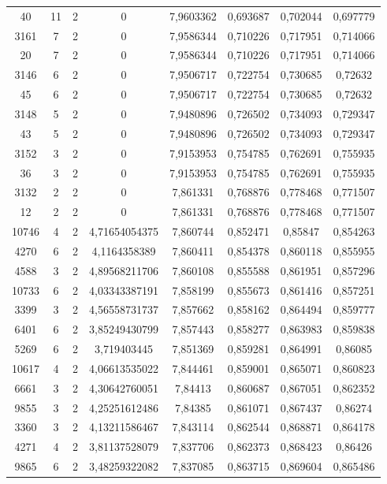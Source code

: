 \begin{longtable}{|c|c|c|c|c|c|c|c|}
40 & 11 & 2 & 0 & 7,9603362 & 0,693687 & 0,702044 & 0,697779 \\
3161 & 7 & 2 & 0 & 7,9586344 & 0,710226 & 0,717951 & 0,714066 \\
20 & 7 & 2 & 0 & 7,9586344 & 0,710226 & 0,717951 & 0,714066 \\
3146 & 6 & 2 & 0 & 7,9506717 & 0,722754 & 0,730685 & 0,72632 \\
45 & 6 & 2 & 0 & 7,9506717 & 0,722754 & 0,730685 & 0,72632 \\
3148 & 5 & 2 & 0 & 7,9480896 & 0,726502 & 0,734093 & 0,729347 \\
43 & 5 & 2 & 0 & 7,9480896 & 0,726502 & 0,734093 & 0,729347 \\
3152 & 3 & 2 & 0 & 7,9153953 & 0,754785 & 0,762691 & 0,755935 \\
36 & 3 & 2 & 0 & 7,9153953 & 0,754785 & 0,762691 & 0,755935 \\
3132 & 2 & 2 & 0 & 7,861331 & 0,768876 & 0,778468 & 0,771507 \\
12 & 2 & 2 & 0 & 7,861331 & 0,768876 & 0,778468 & 0,771507 \\
10746 & 4 & 2 & 4,71654054375 & 7,860744 & 0,852471 & 0,85847 & 0,854263 \\
4270 & 6 & 2 & 4,1164358389 & 7,860411 & 0,854378 & 0,860118 & 0,855955 \\
4588 & 3 & 2 & 4,89568211706 & 7,860108 & 0,855588 & 0,861951 & 0,857296 \\
10733 & 6 & 2 & 4,03343387191 & 7,858199 & 0,855673 & 0,861416 & 0,857251 \\
3399 & 3 & 2 & 4,56558731737 & 7,857662 & 0,858162 & 0,864494 & 0,859777 \\
6401 & 6 & 2 & 3,85249430799 & 7,857443 & 0,858277 & 0,863983 & 0,859838 \\
5269 & 6 & 2 & 3,719403445 & 7,851369 & 0,859281 & 0,864991 & 0,86085 \\
10617 & 4 & 2 & 4,06613535022 & 7,844461 & 0,859001 & 0,865071 & 0,860823 \\
6661 & 3 & 2 & 4,30642760051 & 7,84413 & 0,860687 & 0,867051 & 0,862352 \\
9855 & 3 & 2 & 4,25251612486 & 7,84385 & 0,861071 & 0,867437 & 0,86274 \\
3360 & 3 & 2 & 4,13211586467 & 7,843114 & 0,862544 & 0,868871 & 0,864178 \\
4271 & 4 & 2 & 3,81137528079 & 7,837706 & 0,862373 & 0,868423 & 0,86426 \\
9865 & 6 & 2 & 3,48259322082 & 7,837085 & 0,863715 & 0,869604 & 0,865486 \\

\end{longtable}
